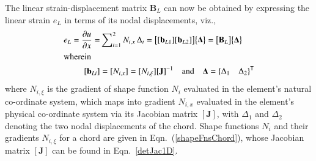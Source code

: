 The linear strain-displacement matrix $\mathbf{B}_L$ can now be obtained by expressing the linear strain $e_L$ in terms of its nodal displacements, viz.,
\begin{subequations}
    \begin{align}
    e_L  = \frac{\partial u}{\partial x}  = &
    \sum\nolimits_{i=1}^2 N_{i,x} \, \Delta_i = 
    \bigl[ 
    [\mathbf{b}_{L1}] [\mathbf{b}_{L2}]
    \bigr] \bigl\{ \begin{matrix} 
    \boldsymbol{\Delta} 
    \end{matrix} \bigr\} 
    = \bigl[ \mathbf{B}_L \bigr] \bigl\{ \boldsymbol{\Delta} \bigr\} \\
    \intertext{wherein} 
    [ \mathbf{b}_{Li} ] & = [ N_{i,x} ] = [ N_{i,\xi} ] [ \mathbf{J} ]^{-1}
    \quad \text{and} \quad
    \mathbf{\Delta}  = 
    \{ \begin{matrix}
    \Delta_1 & \Delta_2
    \end{matrix} \}^{\mathsf{T}}
    \end{align}
\end{subequations}
where $N_{i,\xi}$ is the gradient of shape function $N_i$ evaluated in the element's natural co-ordinate system, which maps into gradient $N_{i,x}$ evaluated in the element's physical co-ordinate system via its Jacobian matrix $[ \mathbf{J} ]$, with $\Delta_1$ and $\Delta_2$ denoting the two nodal displacements of the chord.  Shape functions $N_i$ and their gradients $N_{i,\xi}$ for a chord are given in Eqn.~(\ref{shapeFnsChord}), whose Jacobian matrix $[ \mathbf{J} ]$ can be found in Eqn.~\eqref{detJac1D}.


